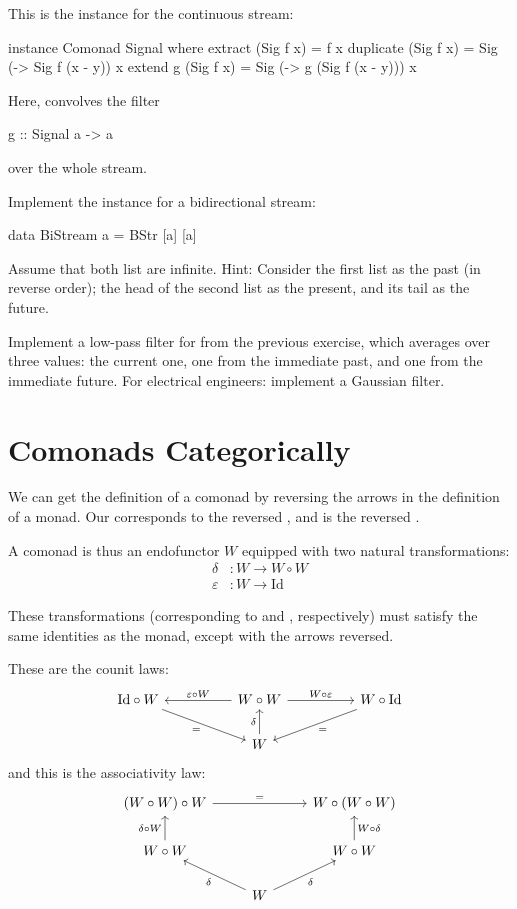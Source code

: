 \documentclass[DaoFP]{subfiles}
\begin{document}
This is the  instance for the continuous stream:
\begin{haskell}
instance Comonad Signal where
  extract (Sig f x) = f x
  duplicate (Sig f x) = Sig (\y -> Sig f (x - y)) x
  extend g (Sig f x) = Sig (\y -> g (Sig f (x - y))) x
\end{haskell}
Here,  convolves the filter 
\begin{haskell}
g :: Signal a -> a
\end{haskell}
over the whole stream. 

\begin{exercise}
Implement the  instance for a bidirectional stream:
\begin{haskell}
data BiStream a = BStr [a] [a]
\end{haskell}
Assume that both list are infinite. Hint: Consider the first list as the past (in reverse order); the head of the second list as the present, and its tail as the future.
\end{exercise}

\begin{exercise}
Implement a low-pass filter for  from the previous exercise, which averages over three values: the current one, one from the immediate past, and one from the immediate future. For electrical engineers: implement a Gaussian filter. 
\end{exercise}

\section{Comonads Categorically}

We can get the definition of a comonad by reversing the arrows in the definition of a monad. Our  corresponds to the reversed , and  is the reversed . 


A comonad is thus an endofunctor $W$ equipped with two natural transformations:
\begin{align*}
\delta &\colon W \to W \circ W \\
\varepsilon &\colon W \to \text{Id} 
\end{align*}

These transformations (corresponding to  and , respectively) must satisfy the same identities as the monad, except with the arrows reversed. 

These are the counit laws:
\[
 \begin{tikzcd}
\text{Id} \circ W
 \arrow[rrd, "="']
& & W \circ W
 \arrow[ll, "\varepsilon \circ W"']
 \arrow[rr, "W \circ \varepsilon"]
&& W \circ \text{Id}
 \arrow[lld, "="]
 \\
 && W
  \arrow[u, "\delta"]
 \end{tikzcd}
\]
and this is the associativity law:
\[
 \begin{tikzcd}
 (W \circ W) \circ W 
 \arrow[rr, "="]
 &&
 W \circ (W \circ W)
 \\
 W \circ W 
 \arrow[u, "\delta \circ W"]
& & W \circ W
 \arrow[u, "W \circ \delta"']
 \\
&  W
 \arrow[ul, "\delta"]
 \arrow[ur, "\delta"']
 \end{tikzcd}
\]
\end{document}

